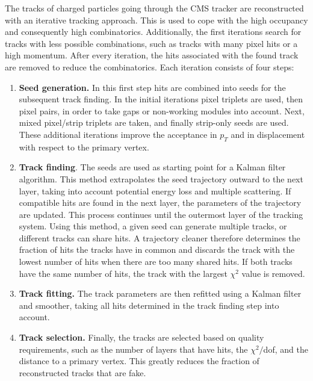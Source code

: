 The tracks of charged particles going through the \ac{CMS} tracker are reconstructed with an iterative tracking approach. This is used to cope with the high occupancy and consequently high combinatorics. Additionally, the first iterations search for tracks with less possible combinations, such as tracks with many pixel hits or a high momentum. After every iteration, the hits associated with the found track are removed to reduce the combinatorics. Each iteration consists of four steps:
\begin{enumerate}
 \item \textbf{Seed generation.} In this first step hits are combined into seeds for the subsequent track finding. In the initial iterations pixel triplets are used, then pixel pairs, in order to take gaps or non-working modules into account. Next, mixed pixel/strip triplets are taken, and finally strip-only seeds are used. These additional iterations improve the acceptance in $p_T$ and in displacement with respect to the primary vertex.
 \item \textbf{Track finding}. The seeds are used as starting point for a Kalman filter algorithm. This method extrapolates the seed trajectory outward to the next layer, taking into account potential energy loss and multiple scattering. If compatible hits are found in the next layer, the parameters of the trajectory are updated. This process continues until the outermost layer of the tracking system. Using this method, a given seed can generate multiple tracks, or different tracks can share hits. A trajectory cleaner therefore determines the fraction of hits the tracks have in common and discards the track with the lowest number of hits when there are too many shared hits. If both tracks have the same number of hits, the track with the largest $\chi^2$ value is removed.
 \item \textbf{Track fitting.} The track parameters are then refitted using a Kalman filter and smoother, taking all hits determined in the track finding step into account.
 \item \textbf{Track selection.} Finally, the tracks are selected based on quality requirements, such as the number of layers that have hits, the $\chi^2/$dof, and the distance to a primary vertex. This greatly reduces the fraction of reconstructed tracks that are fake.
\end{enumerate}

